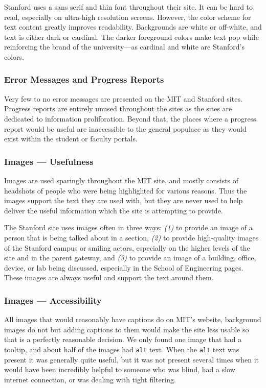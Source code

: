 \setlength{\parindent}{0pt}
Stanford uses a sans serif and thin font throughout their site. It can be hard to read,
especially on ultra-high resolution screens. However, the color scheme for text
content greatly improves readability. Backgrounds are white or off-white, and text
is either dark or cardinal. The darker foreground colors make text pop while
reinforcing the brand of the university---as cardinal and white are Stanford's colors.

\subsubsection*{Error Messages and Progress Reports}

\begin{FlushLeft}

Very few to no error messages are presented on the MIT and Stanford sites.
Progress reports are entirely unused throughout the sites as the sites are dedicated to
information proliforation. Beyond that, the places where a progress report would be
useful are inaccessible to the general populace as they would exist within the student or
faculty portals.

\subsubsection*{Images --- Usefulness}

Images are used sparingly throughout the MIT site, and mostly consists of headshots of people who were
being highlighted for various reasons. Thus the images support the text they are used
with, but they are never used to help deliver the useful information which the site
is attempting to provide.

The Stanford site uses images often in three ways: \textit{(1)} to provide an image
of a person that is being talked about in a section, \textit{(2)} to provide high-quality
images of the Stanford campus or smiling actors, especially on the higher levels of
the site and in the parent gateway, and \textit{(3)} to provide an image of a building,
office, device, or lab being discussed, especially in the School of Engineering
pages. These images are always useful and support the text around them.

\subsubsection*{Images --- Accessibility}

All images that would reasonably have captions do on MIT's website, background images do not but
adding captions to them would make the site less usable so that is a perfectly reasonable
decision. We only found one image that had a tooltip, and
about half of the images had \texttt{alt} text. When the \texttt{alt} text was present it was generally quite
useful, but it was not present several times when it would have been incredibly helpful to
someone who was blind, had a slow internet connection, or was dealing with tight filtering.


\end{FlushLeft}
